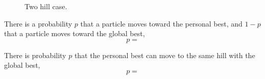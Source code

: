 \begin{figure}
\centering
{}
\caption{Two hill case.}
\label{fig:two_hills_case}
\end{figure}


\begin{theorem}
There is a probability $ p $  that a particle moves toward the personal best, and $ 1 - p $ that a particle moves toward the global best,
\begin{equation}
p = 
\end{equation}
\end{theorem}

\begin{corollary}
There is probability $ p $ that the personal best can move to the same hill with the global best,
\begin{equation}
p = 
\end{equation}
\end{corollary}